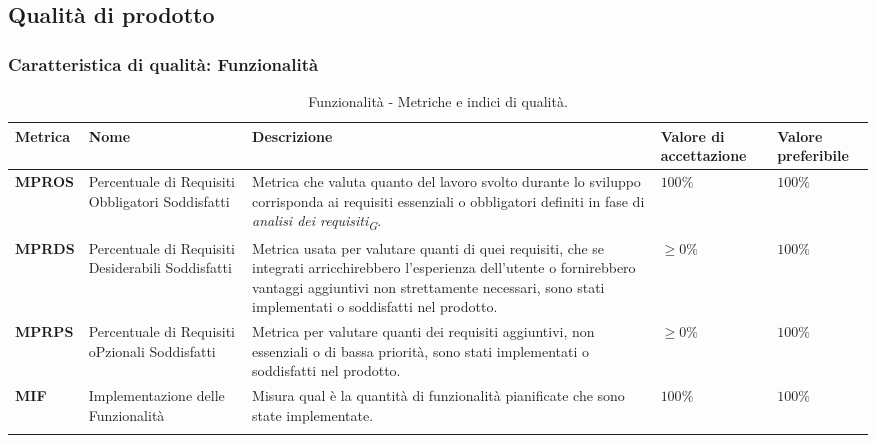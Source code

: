 \subsection{Qualità di prodotto}

\subsubsection{Caratteristica di qualità: Funzionalità}
\hspace{1pt}
    \begin{longtable}{|C{1.5cm}|L{3cm}|L{4cm}|L{2.5cm}|L{2.5cm}|}
        \hline
        \textbf{Metrica} & \textbf{Nome} & \textbf{Descrizione} & \textbf{Valore di accettazione} & \textbf{Valore preferibile} \\
        \hline
        \textbf{MPROS} & Percentuale di Requisiti Obbligatori Soddisfatti & Metrica che valuta quanto del lavoro svolto durante lo sviluppo corrisponda ai requisiti essenziali o obbligatori definiti in fase di \textit{analisi dei requisiti}\textsubscript{\textit{G}}.  & $ 100\%$  & $ 100\%$ \\
        \hline
        \textbf{MPRDS} & Percentuale di Requisiti Desiderabili Soddisfatti & Metrica usata per valutare quanti di quei requisiti, che se integrati arricchirebbero l'esperienza dell'utente o fornirebbero vantaggi aggiuntivi non strettamente necessari, sono stati implementati o soddisfatti nel prodotto. & $\geq 0\%$ & $100\%$ \\
        \hline
        \textbf{MPRPS} & Percentuale di Requisiti oPzionali Soddisfatti & Metrica per valutare quanti dei requisiti aggiuntivi, non essenziali o di bassa priorità, sono stati implementati o soddisfatti nel prodotto. & $\geq 0\%$ & $100\%$ \\
        \hline
        \textbf{MIF} & Implementazione delle Funzionalità & Misura qual è la quantità di funzionalità pianificate che sono state implementate. & $ 100\%$ & $ 100\%$ \\
        \hline
        \caption{Funzionalità - Metriche e indici di qualità.}
        \label{tab:metriche_funzionalità_testo}
    \end{longtable}

